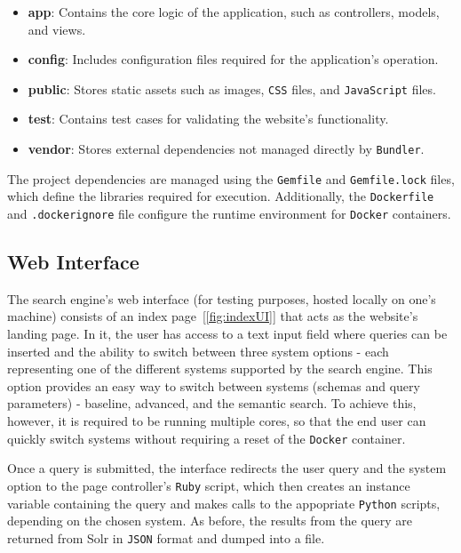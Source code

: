 \documentclass[sigconf]{acmart}
\begin{document}
\begin{itemize} 
    \item \textbf{app}: Contains the core logic of the application, such as controllers, models, and views\cite{mvc}. 
    \item \textbf{config}: Includes configuration files required for the application's operation. 
    \item \textbf{public}: Stores static assets such as images, \texttt{CSS} files, and \texttt{JavaScript} files. 
    \item \textbf{test}: Contains test cases for validating the website's functionality. 
    \item \textbf{vendor}: Stores external dependencies not managed directly by \texttt{Bundler}. 
\end{itemize}

The project dependencies are managed using the \texttt{Gemfile} and \texttt{Gemfile.lock} files, which define the libraries required for execution. Additionally, the \texttt{Dockerfile} and \texttt{.dockerignore} file configure the runtime environment for \texttt{Docker} containers.

\subsection{Web Interface}

The search engine's web interface (for testing purposes, hosted locally on one's machine) consists of an index page~[\ref{fig:indexUI}] that acts as the website's landing page. In it, the user has access to a text input field where queries can be inserted and the ability to switch between three system options - each representing one of the different systems supported by the search engine. This option provides an easy way to switch between systems (schemas and query parameters) - baseline, advanced, and the semantic search.
To achieve this, however, it is required to be running multiple cores, so that the end user can quickly switch systems without requiring a reset of the \texttt{Docker} container.

Once a query is submitted, the interface redirects the user query and the system option to the page controller's \texttt{Ruby} script, which then creates an instance variable\cite{instancevars} containing the query and makes calls to the appopriate \texttt{Python} scripts, depending on the chosen system. As before, the results from the query are returned from Solr in \texttt{JSON} format and dumped into a file.
\end{document}
